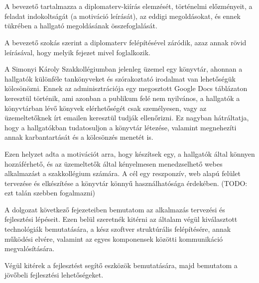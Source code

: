 \chapter{\bevezetes}

A bevezető tartalmazza a diplomaterv-kiírás elemzését, történelmi előzményeit, a feladat indokoltságát (a motiváció leírását), az eddigi megoldásokat, és ennek tükrében a hallgató megoldásának összefoglalását.

A bevezető szokás szerint a diplomaterv felépítésével záródik, azaz annak rövid leírásával, hogy melyik fejezet mivel foglalkozik.

A Simonyi Károly Szakkollégiumban jelenleg üzemel egy könyvtár, ahonnan a hallgatók különféle tankönyveket és szórakoztató irodalmat van lehetőségük kölcsönözni.
Ennek az adminisztrációja egy megosztott Google Docs táblázaton keresztül történik, ami azonban a publikum felé nem nyilvános, a hallgatók a könyvtárban lévő könyvek elérhetőségét csak személyesen,
vagy az üzemeltetőknek írt emailen keresztül tudják ellenőrizni. Ez nagyban hátráltatja, hogy a hallgatókban tudatosuljon a könyvtár létezése, valamint  megnehezíti annak karbantartását és a kölcsönzés menetét is.

Ezen helyzet adta a motivációt arra, hogy készítsek egy, a hallgatók által könnyen hozzáférhető, és az üzemeltetők által kényelmesen menedzselhető webes alkalmazást a szakkollégium számára.
A cél egy reszponzív, web alapú felület tervezése és elkészítése a könyvtár könnyű használhatósága érdekében. (TODO: ezt talán szebben fogalmazni)

A dolgozat következő fejezeteiben bemutatom az alkalmazás tervezési és fejlesztési lépéseit.
Ezen belül szeretnék kitérni az általam végül kiválasztott technológiák bemutatására, a kész szoftver struktúrális felépítésére,
annak működési elvére, valamint az egyes komponensek közötti kommunikáció megvalósítására.

Végül kitérek a fejlesztést segítő eszközök bemutatására, majd bemutatom a jövőbeli fejlesztési lehetőségeket.

